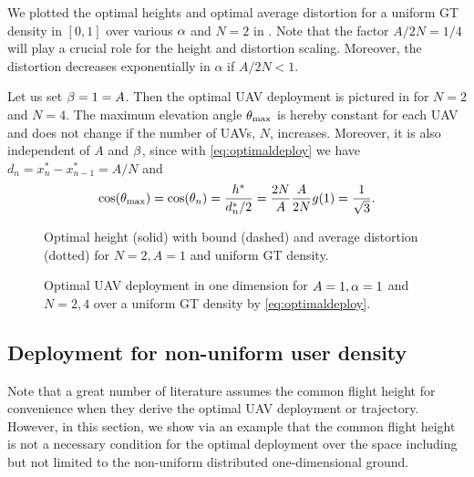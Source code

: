 \documentclass[smallabstract,smallcaptions]{dccpaper}
\newcounter{example}[section]
\newenvironment{example}[1][]{\refstepcounter{example}\par\vspace{1.5ex}\noindent{\em Example~\theexample. #1}}{\par\vspace{1.5ex}}
\newcommand{\junstart}{\color{black}}
\begin{document}
\begin{example}
We plotted  the optimal heights and optimal average distortion for a uniform GT density in $[0,1]$ over various $\alpha$
and $N=2$ in . Note that the factor $A/2N=1/4$ will play a crucial role for the height and
distortion scaling. Moreover, the distortion decreases exponentially in $\alpha$ if $A/2N<1$.

Let us set $\beta=1=A$. Then the optimal UAV deployment is pictured in  for $N=2$ and $N=4$. The
maximum elevation angle $\theta_{\text{max}}$ is hereby constant for each UAV and does not change if the number of UAVs,
$N$, increases.  Moreover, it is also independent of $A$ and $\beta$, since with \eqref{eq:optimaldeploy} we have
$d_n=x^*_n-x^*_{n-1}=A/N$ and
%
\begin{align}
  \cos(\theta_{\text{max}})=\cos(\theta_n)= \frac{h^*}{d^*_n/2}= \frac{2N}{A}\frac{A}{2N}   g(1)= \frac{1}{\sqrt{3}}.
\end{align}
\end{example}
% 
\begin{figure}
\begin{minipage}[b]{0.4\textwidth}
  \vspace{1ex}
\def\svgwidth{1.1\textwidth} \scriptsize{
  }
  \vspace{-3.2ex}
  \caption{{\small Optimal height (solid) with bound (dashed) and average distortion (dotted) for $N=2,A=1$ and uniform GT density.}}
  \label{fig:goptdopt}
\end{minipage}
\hfill
  \begin{minipage}[b]{0.56\textwidth}
\hspace{-2ex} 
    \def\svgwidth{1.1\textwidth} \scriptsize{
      }
      \caption{{\small Optimal UAV deployment in one dimension for $A=1,\alpha=1$ and $N=2,4$ over a uniform GT density
      by \eqref{eq:optimaldeploy}.}}
      \label{fig:uavonedim}
    \end{minipage}
\end{figure}
%


\junstart
{} %
\subsection{Deployment for non-uniform user density}
%
Note that a great number of literature assumes the common flight height for convenience when they derive the optimal UAV
deployment or trajectory.  However, in this section, we show via an example that the common flight height is not a
necessary condition for the optimal deployment over the space including but not limited to the non-uniform distributed
one-dimensional ground.
\fi %
\end{document}
